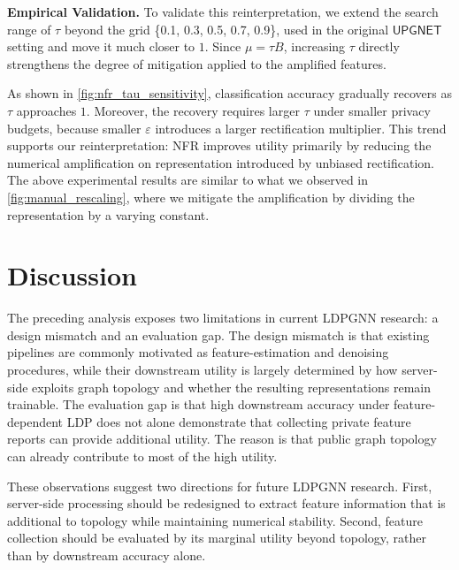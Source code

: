 \documentclass[conference,compsoc]{IEEEtran}
\theoremstyle{boldplain}
\theoremstyle{bolddefinition}
\theoremstyle{remark}
\newcommand{\mypara}[1]{\noindent\textbf{#1.}\xspace}
\newcommand{\ldpgnn}{LDPGNN\xspace}
\newcommand{\upgnet}{\ensuremath{\mathsf{UPGNET}}\xspace}
\newcommand{\nfr}{NFR\xspace}
\begin{document}
\vspace{0.1cm}

\mypara{Empirical Validation}
To validate this reinterpretation, we extend the search range of $\tau$ beyond the grid \{0.1, 0.3, 0.5, 0.7, 0.9\}, used in the original \upgnet setting and move it much closer to $1$.
Since $\mu=\tau B$, increasing $\tau$ directly strengthens the degree of mitigation applied to the amplified features. 



As shown in \autoref{fig:nfr_tau_sensitivity}, classification accuracy gradually recovers as $\tau$ approaches $1$.
Moreover, the recovery requires larger $\tau$ under smaller privacy budgets, because smaller $\varepsilon$ introduces a larger rectification multiplier.
This trend supports our reinterpretation: \nfr improves utility primarily by reducing the numerical amplification on representation introduced by unbiased rectification.
The above experimental results are similar to what we observed in \autoref{fig:manual_rescaling}, where we mitigate the amplification by dividing the representation by a varying constant.



\section{Discussion}
\label{sec:discussion}

The preceding analysis exposes two limitations in current \ldpgnn research: a design mismatch and an evaluation gap.
The design mismatch is that existing pipelines are commonly motivated as feature-estimation and denoising procedures, while their downstream utility is largely determined by how server-side exploits graph topology and whether the resulting representations remain trainable.
The evaluation gap is that high downstream accuracy under feature-dependent LDP does not alone demonstrate that collecting private feature reports can provide additional utility.
The reason is that public graph topology can already contribute to most of the high utility.

These observations suggest two directions for future \ldpgnn research.
First, server-side processing should be redesigned to extract feature information that is additional to topology while maintaining numerical stability.
Second, feature collection should be evaluated by its marginal utility beyond topology, rather than by downstream accuracy alone.

\vspace{0.1cm}
\end{document}
